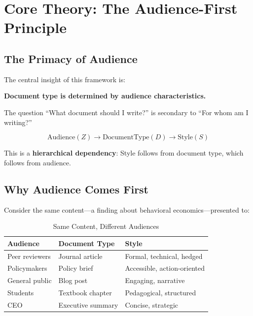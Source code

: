 \section{Core Theory: The Audience-First Principle}
\label{sec:doctype-theory-audience}

\subsection{The Primacy of Audience}

The central insight of this framework is:

\begin{tcolorbox}[colback=yellow!5!white, colframe=yellow!75!black,
    title=The Audience-First Principle]
\textbf{Document type is determined by audience characteristics.}

The question ``What document should I write?'' is secondary to
``For whom am I writing?''

\begin{equation}
\text{Audience}(Z) \rightarrow \text{DocumentType}(D) \rightarrow \text{Style}(S)
\end{equation}

This is a \textbf{hierarchical dependency}: Style follows from document type,
which follows from audience.
\end{tcolorbox}

\subsection{Why Audience Comes First}

Consider the same content---a finding about behavioral economics---presented to:

\begin{table}[htbp]
\centering
\caption{Same Content, Different Audiences}
\label{tab:audience-examples}
\renewcommand{\arraystretch}{1.3}
\begin{tabular}{@{}lll@{}}
\toprule
\textbf{Audience} & \textbf{Document Type} & \textbf{Style} \\
\midrule
Peer reviewers & Journal article & Formal, technical, hedged \\
Policymakers & Policy brief & Accessible, action-oriented \\
General public & Blog post & Engaging, narrative \\
Students & Textbook chapter & Pedagogical, structured \\
CEO & Executive summary & Concise, strategic \\
\bottomrule
\end{tabular}
\end{table}

